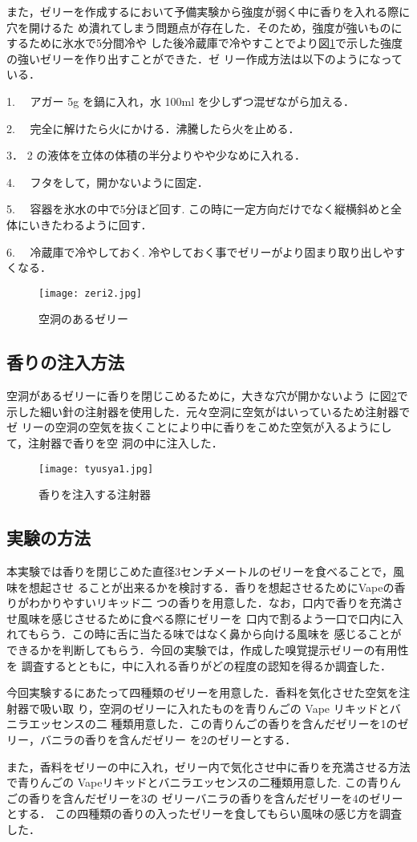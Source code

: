 また，ゼリーを作成するにおいて予備実験から強度が弱く中に香りを入れる際に穴を開けるた
め潰れてしまう問題点が存在した．そのため，強度が強いものにするために氷水で5分間冷や
した後冷蔵庫で冷やすことでより図\ref{zeri}で示した強度の強いゼリーを作り出すことができた．ゼ
リー作成方法は以下のようになっている．


1. 　アガー 5g を鍋に入れ，水 100ml を少しずつ混ぜながら加える．


2. 　完全に解けたら火にかける．沸騰したら火を止める．


3． 2 の液体を立体の体積の半分よりやや少なめに入れる．


4. 　フタをして，開かないように固定．


5. 　容器を氷水の中で5分ほど回す. この時に一定方向だけでなく縦横斜めと全体にいきたわるように回す．


6. 　冷蔵庫で冷やしておく. 冷やしておく事でゼリーがより固まり取り出しやすくなる．


  \begin{figure}[t]
    \centering
    \texttt{[image: zeri2.jpg]}
    \caption{空洞のあるゼリー}
    \label{zeri}
  \end{figure}


\subsection{香りの注入方法}
  空洞があるゼリーに香りを閉じこめるために，大きな穴が開かないよう
に図\ref{tyusya}で示した細い針の注射器を使用した．元々空洞に空気がはいっているため注射器でゼ
リーの空洞の空気を抜くことにより中に香りをこめた空気が入るようにして，注射器で香りを空
洞の中に注入した．

\begin{figure}[t]
  \centering
  \texttt{[image: tyusya1.jpg]}
  \caption{香りを注入する注射器}
  \label{tyusya}
\end{figure}


\subsection{実験の方法}

本実験では香りを閉じこめた直径3センチメートルのゼリーを食べることで，風味を想起させ
ることが出来るかを検討する．香りを想起させるためにVapeの香りがわかりやすいリキッド二
つの香りを用意した．なお，口内で香りを充満させ風味を感じさせるために食べる際にゼリーを
口内で割るよう一口で口内に入れてもらう．この時に舌に当たる味ではなく鼻から向ける風味を
感じることができるかを判断してもらう．今回の実験では，作成した嗅覚提示ゼリーの有用性を
調査するとともに，中に入れる香りがどの程度の認知を得るか調査した．


今回実験するにあたって四種類のゼリーを用意した．香料を気化させた空気を注射器で吸い取
り，空洞のゼリーに入れたものを青りんごの Vape リキッドとバニラエッセンスの二
種類用意した．この青りんごの香りを含んだゼリーを1のゼリー，バニラの香りを含んだゼリー
を2のゼリーとする．


また，香料をゼリーの中に入れ，ゼリー内で気化させ中に香りを充満させる方法で青りんごの
Vapeリキッドとバニラエッセンスの二種類用意した. この青りんごの香りを含んだゼリーを3の
ゼリーバニラの香りを含んだゼリーを4のゼリーとする．
この四種類の香りの入ったゼリーを食してもらい風味の感じ方を調査した．
